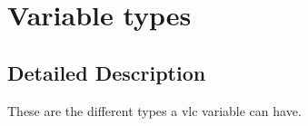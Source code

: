 \hypertarget{group__var__type}{}\section{Variable types}
\label{group__var__type}


\subsection{Detailed Description}
These are the different types a vlc variable can have. 